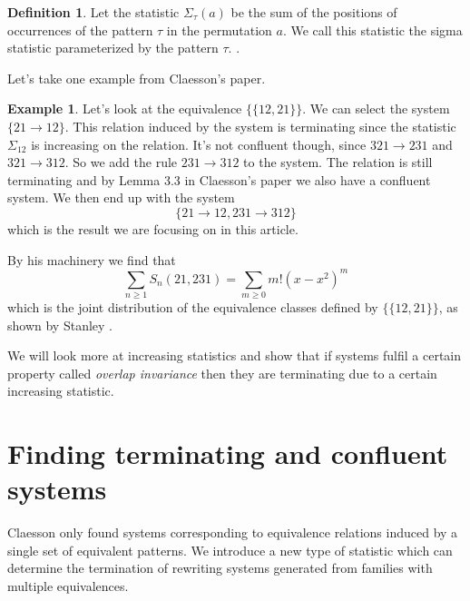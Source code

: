 \documentclass[a4paper, 11pt, english]{article}
\newcommand{\patternrule}{ \to \!}
\theoremstyle{definition}
\newtheorem{definition}[theorem]{Definition}
\newtheorem{example}[theorem]{Example}
\newcommand{\Sym}{S}
\begin{document}
\begin{definition}
    Let the statistic $\Sigma_\tau(a)$ be the sum of the positions of occurrences of
    the pattern $\tau$ in the permutation $a$. We call this statistic the sigma statistic
    parameterized by the pattern $\tau$.
    \cite{claesson:2021}.
\end{definition}

Let's take one example from Claesson's paper.
\begin{example}
    Let's look at the equivalence $\{ \{ 12, 21 \} \}$. We can select the system $\{
        21 \to 12 \}$. This relation induced by the system is terminating since the statistic
    $\Sigma_{12}$ is increasing on the relation. It's not
    confluent though, since $321 \to 231$ and $321 \to 312$. So we add the rule
    $231 \patternrule 312$ to the system. The relation is still terminating and by Lemma
    3.3 in Claesson's paper we also have a confluent system. We then end up with
    the system 
    \[
        \{ 21 \patternrule 12, 231 \patternrule 312 \}
    \]
    which is the result we are focusing on in this article.

    By his machinery we find that 
    \[
        \sum_{n \geq 1} \Sym_n(21, 231) = \sum_{m \geq 0} m!(x-x^2)^m
    \]
    which is the joint distribution of the equivalence classes defined by 
    $\{ \{ 12, 21 \} \}$, as shown by Stanley \cite{stanley:2012}.
\end{example}

We will look more at increasing statistics and show that if systems fulfil a certain property called
\emph{overlap invariance} then they are terminating due to a certain increasing statistic.

\section{Finding terminating and confluent systems}
Claesson only found systems corresponding to equivalence relations induced by a
single set of equivalent patterns. We introduce a new type of statistic which can determine the
termination of rewriting systems generated from families with multiple equivalences.
\end{document}
